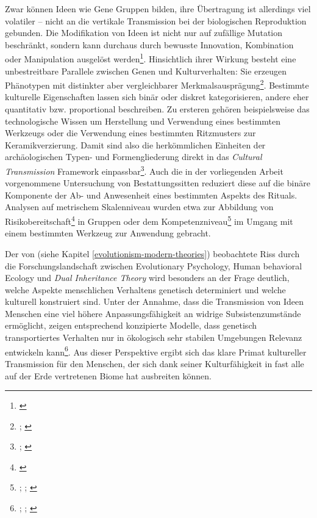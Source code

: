 \documentclass[openany,twoside,twocolumn]{book}
\let\rmarkdownfootnote\footnote%
\def\footnote{\protect\rmarkdownfootnote}
\begin{document}
Zwar können Ideen wie Gene Gruppen bilden, ihre Übertragung ist allerdings viel volatiler -- nicht an die vertikale Transmission bei der biologischen Reproduktion gebunden. Die Modifikation von Ideen ist nicht nur auf zufällige Mutation beschränkt, sondern kann durchaus durch bewusste Innovation, Kombination oder Manipulation ausgelöst werden\footnote{\textcite{eerkens_cultural_2007}}. Hinsichtlich ihrer Wirkung besteht eine unbestreitbare Parallele zwischen Genen und Kulturverhalten: Sie erzeugen Phänotypen mit distinkter aber vergleichbarer Merkmalsausprägung\footnote{\textcite{lyman_culture_2001}; \textcite{lyman_rise_1997}}. Bestimmte kulturelle Eigenschaften lassen sich binär oder diskret kategorisieren, andere eher quantitativ bzw. proportional beschreiben. Zu ersteren gehören beispielsweise das technologische Wissen um Herstellung und Verwendung eines bestimmten Werkzeugs oder die Verwendung eines bestimmten Ritzmusters zur Keramikverzierung. Damit sind also die herkömmlichen Einheiten der archäologischen Typen- und Formengliederung direkt in das \emph{Cultural Transmission} Framework einpassbar\footnote{\textcite{lipo_science_2001}; \textcite{lyman_cultural_2003}}. Auch die in der vorliegenden Arbeit vorgenommene Untersuchung von Bestattungssitten reduziert diese auf die binäre Komponente der Ab- und Anwesenheit eines bestimmten Aspekts des Rituals. Analysen auf metrischem Skalenniveau wurden etwa zur Abbildung von Risikobereitschaft\footnote{\textcite{bisin_economics_2001-1}} in Gruppen oder dem Kompetenzniveau\footnote{\textcite{baldini_revisiting_2015}; \textcite{henrich_demography_2004}; \textcite{kobayashi_innovativeness_2012}} im Umgang mit einem bestimmten Werkzeug zur Anwendung gebracht.

Der von \textcite{smith_three_2000} (siehe Kapitel \ref{evolutionism-modern-theories}) beobachtete Riss durch die Forschungslandschaft zwischen Evolutionary Psychology, Human behavioral Ecology und \emph{Dual Inheritance Theory} wird besonders an der Frage deutlich, welche Aspekte menschlichen Verhaltens genetisch determiniert und welche kulturell konstruiert sind. Unter der Annahme, dass die Transmission von Ideen Menschen eine viel höhere Anpassungsfähigkeit an widrige Subsistenzumstände ermöglicht, zeigen entsprechend konzipierte Modelle, dass genetisch transportiertes Verhalten nur in ökologisch sehr stabilen Umgebungen Relevanz entwickeln kann\footnote{\textcite{aoki_emergence_2005}; \textcite{aoki_evolution_2014}; \textcite{boyd_cultural_1983}}. Aus dieser Perspektive ergibt sich das klare Primat kultureller Transmission für den Menschen, der sich dank seiner Kulturfähigkeit in fast alle auf der Erde vertretenen Biome hat ausbreiten können.
\end{document}
